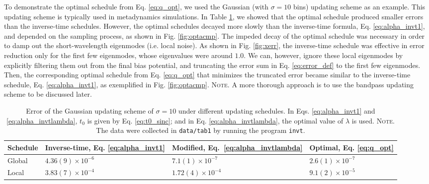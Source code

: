 \documentclass[reprint, superscriptaddress, floatfix]{revtex4-1}
\newcommand{\note}[1]{{\color{DarkGreen}\footnotesize \textsc{Note.} #1}}
\begin{document}
To demonstrate the optimal schedule from Eq. \eqref{eq:q_opt},
we used the Gaussian (with $\sigma = 10$ bins) updating scheme
as an example.
%
This updating scheme is typically used in metadynamics simulations.
%
In Table \ref{tab:error_Gaussian},
we showed that the optimal schedule
produced smaller errors than
the inverse-time schedules.
%
However, the optimal schedules
decayed more slowly than
the inverse-time formula, Eq. \eqref{eq:alpha_invt1},
and depended on the sampling process,
as shown in Fig. \ref{fig:optacmp}.
%
The impeded decay of the optimal schedule
was necessary in order to
damp out the short-wavelength eigenmodes
(i.e. local noise).
%
As shown in Fig. \ref{fig:xerr},
the inverse-time schedule was effective in error reduction
only for the first few eigenmodes,
whose eigenvalues were around $1.0$.
%
We can, however, ignore these local eigenmodes
by explicitly filtering them out from the final bias potential,
and truncating the error sum in Eq. \eqref{eq:error_def}
to the first few eigenmodes.
%
Then, the corresponding optimal schedule
from Eq. \eqref{eq:q_opt} that minimizes the truncated error
became similar to the inverse-time schedule,
Eq. \eqref{eq:alpha_invt1},
as exemplified in Fig. \ref{fig:optacmp}.
%
\note{A more thorough approach is
to use the bandpass updating scheme
to be discussed later.
}


\begin{table}[h]\footnotesize
  \caption{\label{tab:error_Gaussian}
    Error of the Gaussian updating scheme of $\sigma = 10$
    under different updating schedules.
    In Eqs. \eqref{eq:alpha_invt1} and \eqref{eq:alpha_invtlambda},
    $t_0$ is given by Eq. \eqref{eq:t0_sinc};
    and in Eq. \eqref{eq:alpha_invtlambda},
    the optimal value of $\lambda$ is used.
    \note{\newline
      The data were collected in
      \texttt{data/tab1} by running
      the program \texttt{invt}.
    }%
  }
  \setlength{\tabcolsep}{2pt}
  \renewcommand\arraystretch{1.2}
  \begin{tabular} { l | p{2.2cm} p{2.4cm} p{2.0cm} }
    \hline
      Schedule
    &
      Inverse-time, \newline
      Eq. \eqref{eq:alpha_invt1}
    &
      Modified, \newline
      Eq.~\eqref{eq:alpha_invtlambda}
    &
      Optimal, \newline
      Eq. \eqref{eq:q_opt}
    \\
    \hline
    Global
    &
    $4.36(9) \times 10^{-6}$
    &
    $7.1(1) \times 10^{-7}$
    &
    $2.6(1) \times 10^{-7}$
    \\
    \hline
    Local
    &
    $3.83(7) \times 10^{-4}$
    &
    $1.72(4) \times 10^{-4}$
    &
    $9.1(2) \times 10^{-5}$
    \\
    \hline
  \end{tabular}
\end{table}
\end{document}
